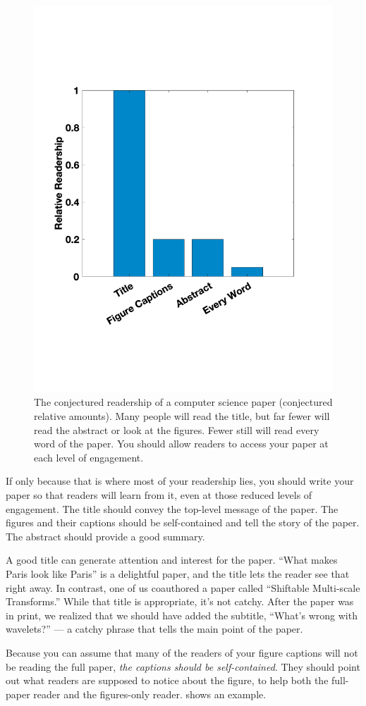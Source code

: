 \begin{figure}
    \centerline{
        \includegraphics[width=0.50\linewidth]{figures/papers/readership.pdf}}
    \caption{The conjectured readership of a computer science paper (conjectured relative amounts).  Many people will read the title, but far fewer will read the abstract or look at the figures.  Fewer still will read every word of the paper.  You should allow readers to access your paper at each level of engagement.}
    \label{fig:engagement}
\end{figure}

If only because that is where most of your readership lies, you should write your paper so that readers will learn from it, even at those reduced levels of engagement.  The title should convey the top-level message of the paper.  The figures and their captions should be self-contained and tell the story of the paper.  The abstract should provide a good summary.

A good title can generate attention and interest for the paper.  ``What makes Paris look like Paris'' \cite{doersch2012what}
is a delightful paper, and the title lets the reader see that right away.  In contrast, one of us coauthored a paper called ``Shiftable Multi-scale Transforms.''  While that title is appropriate, it's not catchy.  After the paper was in print, we realized that we should have added the subtitle, ``What's wrong with wavelets?'' --- a catchy phrase that tells the main point of the paper.

Because you can assume that many of the readers of your figure captions will not be reading the full paper, {\em the captions should be self-contained}.  They should point out what readers are supposed to notice about the figure, to help both the full-paper reader and the figures-only reader. \Fig{\ref{fig:shapetime}} shows an example.


